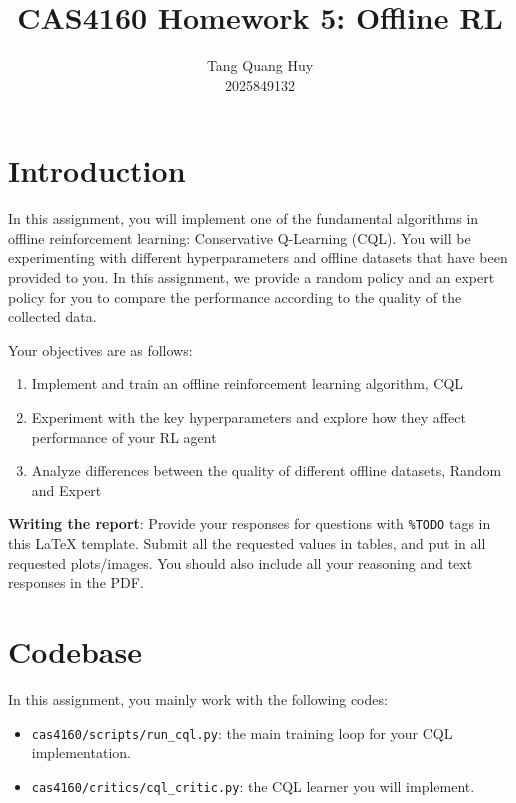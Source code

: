 \documentclass{article}
\title{CAS4160 Homework 5: Offline RL}
\author{
    {Tang Quang Huy} \\
    {2025849132}
}
\begin{document}
\maketitle



\section{Introduction}

In this assignment, you will implement one of the fundamental algorithms in offline reinforcement learning: Conservative Q-Learning (CQL). You will be experimenting with different hyperparameters and offline datasets that have been provided to you. In this assignment, we provide a random policy and an expert policy for you to compare the performance according to the quality of the collected data.

Your objectives are as follows:

\begin{enumerate} 
    \item Implement and train an offline reinforcement learning algorithm, CQL
    \item Experiment with the key hyperparameters and explore how they affect performance of your RL agent
    \item Analyze differences between the quality of different offline datasets, Random and Expert
\end{enumerate}

\noindent\textbf{Writing the report}: Provide your responses for questions with \texttt{\%TODO} tags in this LaTeX template. Submit all the requested values in tables, and put in all requested plots/images. You should also include all your reasoning and text responses in the PDF.



\section{Codebase}

In this assignment, you mainly work with the following codes:
\begin{itemize}
    \item \verb|cas4160/scripts/run_cql.py|: the main training loop for your CQL implementation.
    \item \verb|cas4160/critics/cql_critic.py|: the CQL learner you will implement.
\end{itemize}
\end{document}
